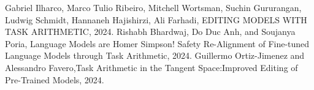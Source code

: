 \documentclass[conference]{IEEEtran}
\begin{document}
\begin{thebibliography}{00}
 Gabriel Ilharco, Marco Tulio Ribeiro, Mitchell Wortsman, Suchin Gururangan, Ludwig Schmidt, Hannaneh Hajishirzi, Ali Farhadi, EDITING MODELS WITH TASK ARITHMETIC, 2024.
 Rishabh Bhardwaj, Do Duc Anh, and Soujanya Poria, Language Models are Homer Simpson! Safety Re-Alignment of Fine-tuned Language Models through Task Arithmetic, 2024.
 Guillermo Ortiz-Jimenez and Alessandro Favero,Task Arithmetic in the Tangent Space:Improved Editing of Pre-Trained Models, 2024.

\end{thebibliography}
\end{document}
